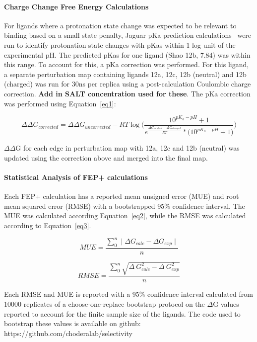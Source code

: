 \documentclass[9pt,lineno]{elife-modified} %
\begin{document}
\paragraph{Charge Change Free Energy Calculations} 
For ligands where a protonation state change was expected to be relevant to binding based on a small state penalty, Jaguar pKa prediction calculations~\citep{Bochevarov2013-bn} were run to identify protonation state changes with pKas within 1 log unit of the experimental pH. The predicted pKas for one ligand (Shao 12b, 7.84) was within this range. To account for this, a pKa correction was performed. For this ligand, a separate perturbation map containing ligands 12a, 12c, 12b (neutral) and 12b (charged) was run for 30ns per replica using a post-calculation Coulombic charge correction. \textbf{Add in SALT concentration used for these}. The pKa correction was performed using Equation~\ref{eq1}: 

\begin{equation}\label{eq1}
\Delta\Delta G_{corrected} = \Delta\Delta G_{uncorrected} - RT\log\Bigg(\frac{10^{pK_a -pH}+1}{e^{\frac{\Delta G_{neutral} - \Delta G_{charged}}{RT}} * \big(10^{pK_a - pH}+1\big)}\Bigg)
\end{equation}

$\Delta\Delta$G for each edge in perturbation map with 12a, 12c and 12b (neutral) was updated using the correction above and merged into the final map. 

 
 \paragraph{Statistical Analysis of FEP+ calculations}
Each FEP+ calculation has a reported mean unsigned error (MUE) and root mean squared error (RMSE) with a bootstrapped 95\% confidence interval. The MUE was calculated according Equation~\ref{eq2}, while the RMSE was calculated according to Equation~\ref{eq3}. 

\begin{equation}\label{eq2}
MUE = \frac{ \sum_{0}^{n} \mid \Delta G _{calc} - \Delta G _{exp} \mid}{n}
 \end{equation}
 
 \begin{equation}\label{eq3}
RMSE = \frac{ \sum_{0}^{n} \sqrt{\Delta~G_{calc}^2 - \Delta~G_{exp}^2}}{n} 
 \end{equation}
 
 Each RMSE and MUE is reported with a 95\% confidence interval calculated from 10000 replicates of a choose-one-replace bootstrap protocol on the $\Delta$G values reported to account for the finite sample size of the ligands. The code used to bootstrap these values is available on github: https://github.com/choderalab/selectivity
 
\end{document}
